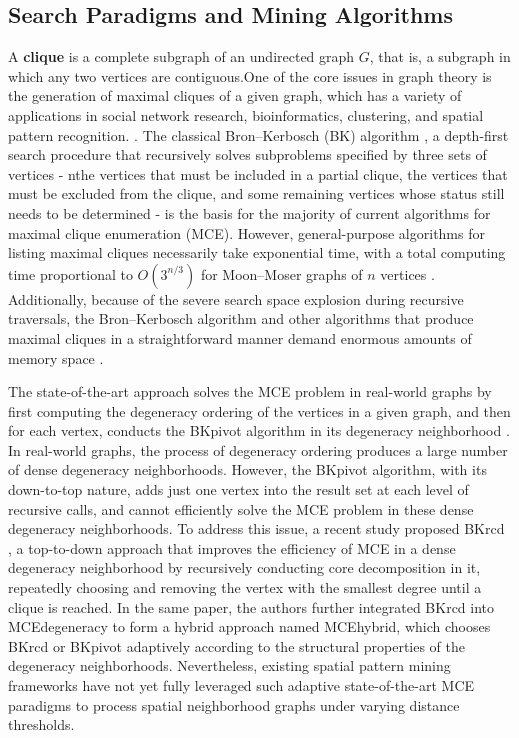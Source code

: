\documentclass[12pt, letterpaper]{template}
\theoremstyle{definition}
\begin{document}
\subsection{Search Paradigms and Mining Algorithms}

A \textbf{clique} is a complete subgraph of an undirected graph $G$, that is, a subgraph in which any two vertices are contiguous.One of the core issues in graph theory is the generation of maximal cliques of a given graph, which has a variety of applications in social network research, bioinformatics, clustering, and spatial pattern recognition. \cite{du2007community, grindley1993identification}. The classical Bron--Kerbosch (BK) algorithm \cite{bron1973algorithm}, a depth-first search procedure that recursively solves subproblems specified by three sets of vertices - nthe vertices that must be included in a partial clique, the vertices that must be excluded from the clique, and some remaining vertices whose status still needs to be determined - is the basis for the majority of current algorithms for maximal clique enumeration (MCE). However, general-purpose algorithms for listing maximal cliques necessarily take exponential time, with a total computing time proportional to $O(3^{n/3})$ for Moon--Moser graphs of $n$ vertices \cite{moon1965cliques}. Additionally, because of the severe search space explosion during recursive traversals, the Bron--Kerbosch algorithm and other algorithms that produce maximal cliques in a straightforward manner demand enormous amounts of memory space \cite{johnston1976cliques, cazals2008note}.

The state-of-the-art approach solves the MCE problem in real-world graphs by first computing the degeneracy ordering of the vertices in a given graph, and then for each vertex, conducts the BKpivot algorithm in its degeneracy neighborhood \cite{tomita2006worst}. In real-world graphs, the process of degeneracy ordering produces a large number of dense degeneracy neighborhoods. However, the BKpivot algorithm, with its down-to-top nature, adds just one vertex into the result set at each level of recursive calls, and cannot efficiently solve the MCE problem in these dense degeneracy neighborhoods. To address this issue, a recent study proposed BKrcd \cite{li2019fast}, a top-to-down approach that improves the efficiency of MCE in a dense degeneracy neighborhood by recursively conducting core decomposition in it, repeatedly choosing and removing the vertex with the smallest degree until a clique is reached. In the same paper, the authors further integrated BKrcd into MCEdegeneracy to form a hybrid approach named MCEhybrid, which chooses BKrcd or BKpivot adaptively according to the structural properties of the degeneracy neighborhoods. Nevertheless, existing spatial pattern mining frameworks have not yet fully leveraged such adaptive state-of-the-art MCE paradigms to process spatial neighborhood graphs under varying distance thresholds.
\end{document}
